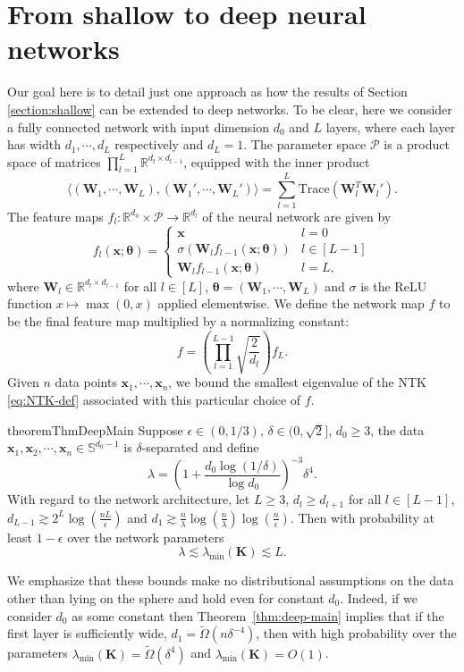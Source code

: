 \documentclass{article}
\theoremstyle{definition}
\newcommand*{\R}{\mathbb{R}}
\newcommand{\mc}{\mathcal}
\renewcommand{\S}{\mathbb{S}}
\def\vtheta{{\bm{\theta}}}
\def\vx{{\bm{x}}}
\def\mK{{\bm{K}}}
\def\mW{{\bm{W}}}
\begin{document}
\section{From shallow to deep neural networks} \label{sec:deep}
Our goal here is to detail just one approach as how the results of Section \ref{section:shallow} can be extended to deep networks. To be clear, here we consider a fully connected network with input dimension $d_0$ and $L$ layers, where each layer has width $d_1, \cdots, d_L$ respectively and $d_L = 1$. The parameter space $\mc{P}$ is a product space of matrices $\prod_{l= 1}^L \R^{d_l \times d_{l -1 } }$, equipped with the inner product
\[
\langle (\mW_1, \cdots, \mW_L), (\mW_1', \cdots, \mW_L') \rangle = \sum_{l = 1}^L \text{Trace}(\mW_l^T\mW_l'). 
\]
The feature maps $f_l: \R^{d_{0}} \times \mc{P} \to \R^{d_l}$ of the neural network are given by
\[f_l(\vx; \vtheta) = \begin{cases}
        \vx & l = 0\\
         \sigma(\mW_l f_{l - 1}(\vx; \vtheta)) & l \in [L - 1]\\
        \mW_l f_{l - 1}(\vx;\vtheta) & l = L,
    \end{cases} 
\]
where $\mW_l \in \R^{d_l \times d_{l-1}}$ for all $l \in [L]$, $\vtheta = (\mW_1, \cdots, \mW_L)$ and $\sigma$ is the ReLU function $x \mapsto \max(0, x)$ applied elementwise. 
We define the network map $f$ to be the final feature map multiplied by a normalizing constant:
\begin{equation} \label{eq:normalization}
f = \left(\prod_{l = 1}^{L - 1}\sqrt{\frac{2}{d_l}  }  \right)f_L.
\end{equation}
Given $n$ data points $\vx_1, \cdots, \vx_n$, we bound the smallest eigenvalue of the NTK \eqref{eq:NTK-def} associated with this particular choice of $f$. 

\begin{restatable}{theorem}{ThmDeepMain}\label{thm:deep-main}
    Suppose $\epsilon \in (0,1/3)$, $\delta \in (0,\sqrt{2}]$, $d_0 \geq 3$, the data $\vx_1, \vx_2, \cdots, \vx_n \in \S^{d_0 -1 }$ is $\delta$-separated and define
    \[
    \lambda = \left(1+ \frac{d_0\log(1/\delta) }{\log d_0}\right)^{-3}\delta^4.
    \]
    With regard to the network architecture, let $L \geq 3$, $d_l \geq d_{l+1}$ for all $l \in [L - 1]$, $d_{L-1} \gtrsim 2^L \log \left (\frac{nL}{\epsilon}\right)$ and $d_1 \gtrsim \tfrac{n}{\lambda} \log \left( \tfrac{n}{\lambda}\right) \log \left( \tfrac{n}{\epsilon}\right)$.
    Then with probability at least $1- \epsilon$ over the network parameters 
    \[
    \lambda \lesssim \lambda_{\min}(\mK) \lesssim L . 
    \]
\end{restatable}
We emphasize that these bounds make no distributional assumptions on the data other than lying on the sphere and hold even for constant $d_0$. 
Indeed, if we consider $d_0$ as some constant then Theorem~\ref{thm:deep-main} implies that if the first layer is sufficiently wide,  $d_1 = \tilde{\Omega}(n \delta^{-4})$,
then with high probability over the parameters $\lambda_{\min}(\mK) = \tilde{\Omega}(\delta^4)$
and $\lambda_{\min}(\mK) = O(1)$.
\end{document}
